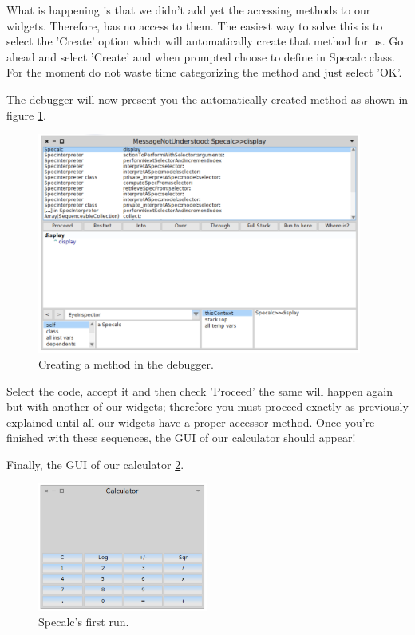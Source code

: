 \documentclass[a4paper,10pt,twoside]{book}
\begin{document}
What is happening is that we didn't add yet the accessing methods to our widgets. Therefore,  has no access to them. The easiest way to solve this is to select the 'Create' option which will automatically create that method for us. Go ahead and select 'Create' and when prompted choose to define  in Specalc class. For the moment do not waste time categorizing the method and just select 'OK'.

The debugger will now present you the automatically created method as shown in figure \ref{addingmethod}.

\begin{figure}

\begin{center}
\includegraphics[width=0.95\textwidth]{figures/addingmethod.png}\caption{Creating a method in the debugger.\label{addingmethod}}\end{center}
\end{figure}


Select the code, accept it and then check 'Proceed' the same will happen again but with another of our widgets; therefore you must proceed exactly as previously explained until all our widgets have a proper accessor method. Once you're finished with these sequences, the GUI of our calculator should appear!

Finally, the GUI of our calculator \ref{firstrun}.

\begin{figure}

\begin{center}
\includegraphics[width=0.5\textwidth]{figures/firstrun.png}\caption{Specalc's first run.\label{firstrun}}\end{center}
\end{figure}
\end{document}
